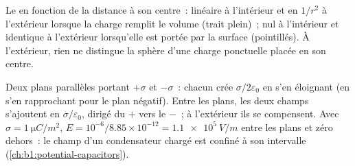 \begin{omfigure}

{\small Le  en fonction de la distance à son
centre~: linéaire à l'intérieur et en $1/r^2$ à l'extérieur lorsque la charge
remplit le volume (trait plein)~; nul à l'intérieur et identique à l'extérieur
lorsqu'elle est portée par la surface (pointillés). À l'extérieur, rien ne
distingue la sphère d'une charge ponctuelle placée en son centre.}
\end{omfigure}

\begin{example}\label{ex:b1:electrostatics-gauss:twoplanes}
Deux plans parallèles portant $+\sigma$ et $-\sigma$~: chacun crée
$\sigma/2\varepsilon_0$ en s'en éloignant (en s'en rapprochant pour le plan négatif).
Entre les plans, les deux champs s'ajoutent en $\sigma/\varepsilon_0$, dirigé du
$+$ vers le $-$~; à l'extérieur ils se compensent. Avec $\sigma = \qty{1}{\micro C/m^2}$, $E =
10^{-6}/8.85 \times 10^{-12} = \qty{1.1e5}{V/m}$ entre les plans et zéro
dehors~: le champ d'un condensateur chargé est confiné à son intervalle
(\cref{ch:b1:potential-capacitors}).
\end{example}


